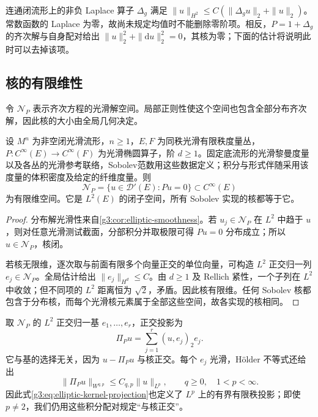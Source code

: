 \begin{example}\label{g3:exm:global-zero-order-term}
	连通闭流形上的非负 Laplace 算子 \(\Delta_g\) 满足
	\(\|u\|_{H^2}\le C(\|\Delta_gu\|_2+\|u\|_2)\)。常数函数的 Laplace 为零，故尚未规定均值时不能删除零阶项。相反，\(P=1+\Delta_g\) 的齐次解与自身配对给出 \(\|u\|_2^2+\|\mathrm du\|_2^2=0\)，其核为零；下面的估计将说明此时可以去掉该项。
\end{example}

\subsection{核的有限维性}
\label{g3:subsec:1301:03}
令 \(\mathcal N_P\) 表示齐次方程的光滑解空间。局部正则性使这个空间也包含全部分布齐次解，因此核的大小由全局几何决定。

\begin{proposition}\label{g3:prop:finite-elliptic-kernel}
	设 \(M^n\) 为非空闭光滑流形，\(n\ge1\)，\(E,F\) 为同秩光滑有限秩度量丛，\(P:C^\infty(E)\to C^\infty(F)\) 为光滑椭圆算子，阶 \(d\ge1\)。固定底流形的光滑黎曼度量以及各丛的光滑参考联络，Sobolev范数用这些数据定义；积分与形式伴随采用该度量的体积密度及给定的纤维度量。则
	\[
		\mathcal N_P=\{u\in\mathcal D'(E):Pu=0\}
		\subset C^\infty(E)
	\]
	为有限维空间。它是 \(L^2(E)\) 的闭子空间，所有 Sobolev 实现的核都等于它。
\end{proposition}
\begin{proof}
	分布解光滑性来自\cref{g3:cor:elliptic-smoothness}。若 \(u_j\in\mathcal N_P\) 在 \(L^2\) 中趋于 \(u\)，则对任意光滑测试截面，分部积分并取极限可得 \(Pu=0\) 分布成立；所以 \(u\in\mathcal N_P\)，核闭。

	若核无限维，逐次取与前面有限多个向量正交的单位向量，可构造 \(L^2\) 正交归一列 \(e_j\in\mathcal N_P\)。全局估计给出 \(\|e_j\|_{H^d}\le C\)。由 \(d\ge1\) 及 Rellich 紧性，一个子列在 \(L^2\) 中收敛；但不同项的 \(L^2\) 距离恒为 \(\sqrt2\)，矛盾。因此核有限维。任何 Sobolev 核都包含于分布核，而每个光滑核元素属于全部这些空间，故各实现的核相同。
\end{proof}

取 \(\mathcal N_P\) 的 \(L^2\) 正交归一基 \(e_1,\ldots,e_r\)，正交投影为
\begin{equation}\label{g3:eq:elliptic-kernel-projection}
	\Pi_Pu=\sum_{j=1}^r(u,e_j)_2e_j.
\end{equation}
它与基的选择无关，因为 \(u-\Pi_Pu\) 与核正交。每个 \(e_j\) 光滑，Hölder 不等式还给出
\[
	\|\Pi_Pu\|_{W^{q,p}}\le C_{q,p}\|u\|_{L^p},
	\qquad q\ge0,\quad1<p<\infty.
\]
因此式\eqref{g3:eq:elliptic-kernel-projection}也定义了 \(L^p\) 上的有界有限秩投影；即使 \(p\ne2\)，我们仍用这些积分配对规定“与核正交”。

